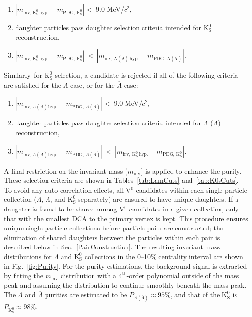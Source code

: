 \documentclass[ALICE,manyauthors]{cernphprep}
\newcommand{\minv}{$m_{\mathrm{inv}}$\xspace}
\newcommand{\Lam}{$\Lambda$\xspace}
\newcommand{\ALam}{$\overline{\Lambda}$\xspace}
\newcommand{\LamALam}{$\Lambda$ ($\overline{\Lambda}$)\xspace}
\newcommand{\Ks}{$\mathrm{K^{0}_{S}}$\xspace}
\newcommand{\Vz}{V$^{0}$\xspace}
\begin{document}
\begin{enumerate}
 \item $\left|m_{\mathrm{inv,\,K^{0}_{S}\,hyp.}} - m_{\mathrm{PDG,\,K^{0}_{S}}}\right| < $ 9.0 MeV/$c^{2}$,
 \item daughter particles pass daughter selection criteria intended for \Ks reconstruction,
 \item $\left|m_{\mathrm{inv,\,K^{0}_{S}\,hyp.}} - m_{\mathrm{PDG,\,K^{0}_{S}}}\right|~ < ~\left|m_{\mathrm{inv,\,\Lambda(\overline{\Lambda})\,hyp.}} - m_{\mathrm{PDG,\,\Lambda(\overline{\Lambda})}}\right|$.
\end{enumerate} 
Similarly, for \Ks selection, a candidate is rejected if all of the following criteria are satisfied for the \Lam case, or for the \ALam case:
\begin{enumerate}
 \item $\left|m_{\mathrm{inv},\,\Lambda(\overline{\Lambda})\,\mathrm{hyp.}} - m_{\mathrm{PDG},\,\Lambda(\overline{\Lambda})}\right| < $ 9.0 MeV/$c^{2}$,
 \item daughter particles pass daughter selection criteria intended for \LamALam reconstruction,
 \item $\left|m_{\mathrm{inv},\,\Lambda(\overline{\Lambda})\,\mathrm{hyp.}} - m_{\mathrm{PDG},\,\Lambda(\overline{\Lambda})}\right|~ < ~\left|m_{\mathrm{inv},\,\mathrm{K}^{0}_{S}\,\mathrm{hyp.}} - m_{\mathrm{PDG},\,\mathrm{K}^{0}_{S}}\right|$.
\end{enumerate} 

A final restriction on the invariant mass (\minv) is applied to enhance the purity.
These selection criteria are shown in Tables~\ref{tab:LamCuts} and~\ref{tab:K0sCuts}.
To avoid any auto-correlation effects, all \Vz candidates within each single-particle collection (\Lam, \ALam, and \Ks separately) are ensured to have unique daughters. 
If a daughter is found to be shared among \Vz candidates in a given collection, only that with the smallest DCA to the primary vertex is kept.
This procedure ensures unique single-particle collections before particle pairs are constructed; the elimination of shared daughters between the particles within each pair is described below in Sec.~\ref{PairConstruction}.
The resulting invariant mass distributions for \Lam and \Ks collections in the 0--10\% centrality interval are shown in Fig.~\ref{fig:Purity}.
For the purity estimations, the background signal is extracted by fitting the \minv distribution with a $4^{\mathrm{th}}$-order polynomial outside of the mass peak and assuming the distribution to continue smoothly beneath the mass peak.
The \Lam and \ALam purities are estimated to be $P_{\Lambda(\overline{\Lambda})} \approx 95\%$, and that of the \Ks is $P_{\mathrm{K^{0}_{S}}} \approx 98\%$.
\end{document}
